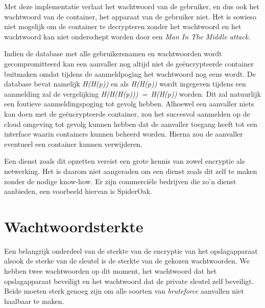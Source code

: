 Met deze implementatie verlaat het wachtwoord van de gebruiker, en dus ook het
wachtwoord van de container, het apparaat van de gebruiker niet. Het is sowieso
niet mogelijk om de container te decrypteren zonder het wachtwoord en het
wachtwoord kan niet onderschept worden door een \textit{Man In The Middle
	attack}.

Indien de database met alle gebruikersnamen en wachtwoorden wordt
gecompromitteerd kan een aanvaller nog altijd niet de geëncrypteerde container
buitmaken omdat tijdens de aanmeldpoging het wachtwoord nog eens
 wordt.
De database bevat namelijk \textit{H(H(p))} en als \textit{H(H(p))} wordt
ingegeven tijdens een aanmelding zal de vergelijking
\textit{H(H(H(p)))~=~H(H(p))} worden. Dit zal natuurlijk een foutieve
aanmeldingspoging tot gevolg
hebben. Alhoewel een aanvaller niets kan doen met de geëncrypteerde container,
zou het succesvol aanmelden op de cloud omgeving tot gevolg kunnen hebben dat de
aanvaller toegang heeft tot een interface waarin containers kunnen beheerd
worden. Hierna zou de aanvaller eventueel een container kunnen verwijderen.

Een dienst zoals dit opzetten vereist een grote kennis van zowel encryptie als
netwerking. Het is daarom niet aangeraden om een dienst zoals dit zelf te maken
zonder de nodige know-how. Er zijn commerciële bedrijven die zo’n dienst
aanbieden, een voorbeeld hiervan is SpiderOak.

\section{Wachtwoordsterkte}
\label{sec:wachtwoordsterkte}

Een belangrijk onderdeel van de sterkte van de encryptie van het opslagapparaat
alsook de sterke van de sleutel is de sterkte van de gekozen wachtwoorden. We
hebben twee wachtwoorden op dit moment, het wachtwoord dat het opslagapparaat
beveiligt en het wachtwoord dat de private sleutel zelf beveiligt. Beide moeten
sterk genoeg zijn om alle soorten van \textit{bruteforce} aanvallen niet
haalbaar te maken.

